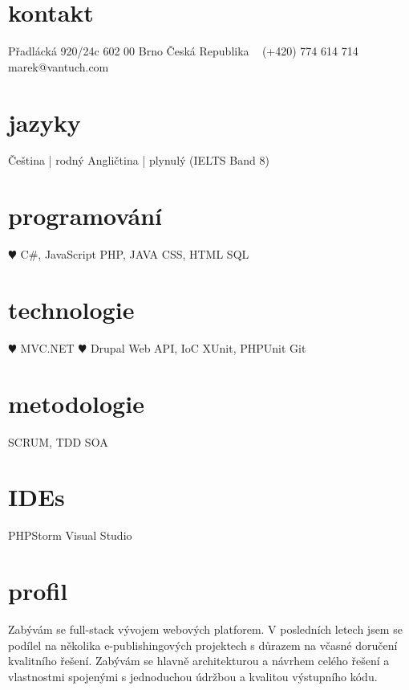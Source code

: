 \documentclass[]{friggeri-cv} %
\begin{document}


\begin{aside} %
\section{kontakt}
Přadlácká 920/24c
602 00 Brno
Česká Republika
~
(+420) 774 614 714
~
marek@vantuch.com
\section{jazyky}
Čeština | rodný
Angličtina | plynulý
(IELTS Band 8)
\section{programování}
{\color{red} $\varheartsuit$} C\#, JavaScript
PHP, JAVA
CSS, HTML
SQL
\section{technologie}
{\color{red} $\varheartsuit$} MVC.NET {\color{red} $\varheartsuit$} Drupal
Web API, IoC
XUnit, PHPUnit
Git
\section{metodologie}
SCRUM, TDD
SOA
\section{IDEs}
PHPStorm
Visual Studio
\end{aside}

\section{profil}
Zabývám se full-stack vývojem webových platforem.
V posledních letech jsem se podílel na několika e-publishingových projektech s důrazem na včasné doručení kvalitního řešení.
Zabývám se hlavně architekturou a návrhem celého řešení a vlastnostmi spojenými s jednoduchou údržbou a kvalitou výstupního kódu.
\end{document}
